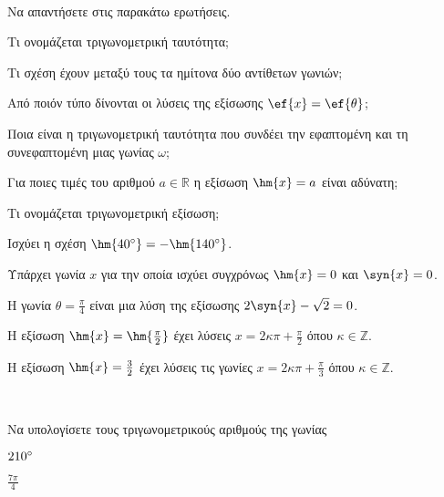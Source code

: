 \documentclass[twoside,nofonts,ektypwsh]{frontisthrio-diag}
\begin{document}
\begin{thema}
\item\mbox{}\\
\vspace{-7mm}
\begin{erwthma}
\item Να απαντήσετε στις παρακάτω ερωτήσεις.
\begin{alist}
\item Τι ονομάζεται τριγωνομετρική ταυτότητα;
\item Τι σχέση έχουν μεταξύ τους τα ημίτονα δύο αντίθετων γωνιών;
\item Από ποιόν τύπο δίνονται οι λύσεις της εξίσωσης $\ef{x}=\ef{\theta}$;
\item Ποια είναι η τριγωνομετρική ταυτότητα που συνδέει την εφαπτομένη και τη συνεφαπτομένη μιας γωνίας $\omega$;
\item Για ποιες τιμές του αριθμού $a\in\mathbb{R}$ η εξίσωση $\hm{x}=a$ είναι αδύνατη;
\item Τι ονομάζεται τριγωνομετρική εξίσωση;
\end{alist}
\item\swstolathos
\begin{alist}
\item Ισχύει η σχέση $\hm{40\degree}=-\hm{140\degree}$.
\item Υπάρχει γωνία $x$ για την οποία ισχύει συγχρόνως $\hm{x}=0$ και $\syn{x}=0$.
\item Η γωνία $\theta=\frac{\pi}{4}$ είναι μια λύση της εξίσωσης $2\syn{x}-\sqrt{2}=0$.
\item Η εξίσωση $\hm{x}=\hm{\frac{\pi}{2}}$ έχει λύσεις $x=2\kappa \pi+\frac{\pi}{2}$ όπου $\kappa\in\mathbb{Z}$.
\item Η εξίσωση $\hm{x}=\frac{3}{2}$ έχει λύσεις τις γωνίες $x=2\kappa\pi+\frac{\pi}{3}$ όπου $\kappa\in\mathbb{Z}$.
\end{alist}
\end{erwthma}
\item\mbox{}\\
\vspace{-7mm}
\begin{erwthma}
\item Να υπολογίσετε τους τριγωνομετρικούς αριθμούς της γωνίας
\begin{multicols}{2}
\begin{alist}
\item $210\degree$
\item $\frac{7\pi}{4}$

\end{alist}
\end{multicols}
\end{erwthma}
\end{thema}
\end{document}
